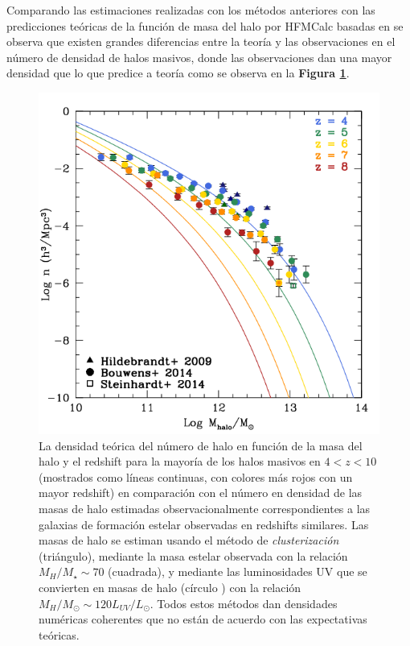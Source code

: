 Comparando las estimaciones realizadas con los métodos anteriores con las predicciones teóricas de la función de masa del halo por HFMCalc \cite{murray2013hmfcalc} basadas en \cite{10.1046/j.1365-8711.2001.04006.x} se observa que existen grandes diferencias entre la teoría y las observaciones en el número de densidad de halos masivos, donde las observaciones dan una mayor densidad que lo que predice a teoría como se observa en la \textbf{Figura \ref{fig:halmf}}.
\begin{figure}
\begin{center}
\includegraphics[scale=0.5]{Figuras/halomf}
\caption{\label{fig:halmf} La densidad teórica del número de halo en función de la masa del halo y el redshift \citep{murray2013hmfcalc} para la mayoría de los halos masivos en $4 <z <10$ (mostrados como líneas continuas, con colores más rojos con un mayor redshift) en comparación con el número en densidad de las masas de halo estimadas observacionalmente correspondientes a las galaxias de formación estelar observadas en redshifts similares. Las masas de halo se estiman usando el método de \textit{clusterización} (triángulo), mediante la masa estelar observada con la relación $M_H/ M_\star \sim 70$ (cuadrada), y mediante las luminosidades UV que se convierten en masas de halo (círculo ) con la relación $M_H / M_\odot \sim 120L_{UV} / L_\odot$. Todos estos métodos dan densidades numéricas coherentes que no están de acuerdo con las expectativas teóricas.}
\end{center}
\end{figure}


